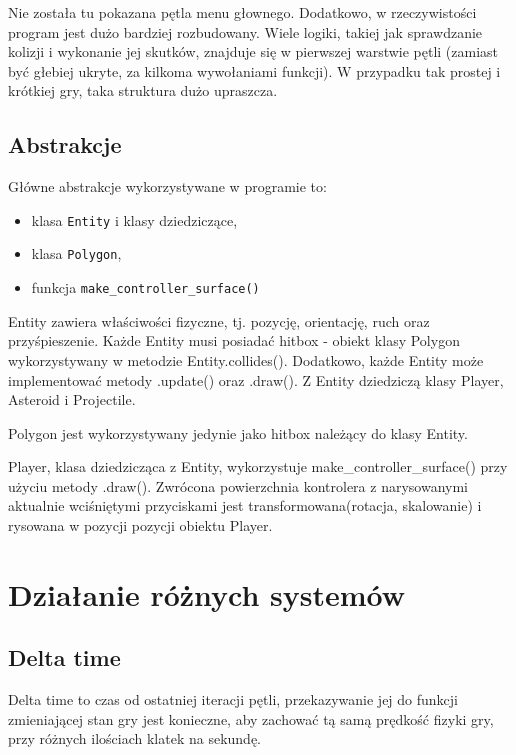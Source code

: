 \documentclass[12pt,a4paper]{article}
\begin{document}
\noindent Nie została tu pokazana pętla menu głownego. Dodatkowo, w rzeczywistości program jest dużo bardziej rozbudowany. 
Wiele logiki, takiej jak sprawdzanie kolizji i wykonanie jej skutków, znajduje się w pierwszej warstwie pętli (zamiast być głebiej ukryte, za kilkoma wywołaniami funkcji). W przypadku tak prostej i krótkiej gry, taka struktura dużo upraszcza.

\newpage
\subsection{Abstrakcje}
Główne abstrakcje wykorzystywane w programie to:
\begin{itemize}
\item klasa \texttt{Entity} i klasy dziedziczące,
\item klasa \texttt{Polygon},
\item funkcja \texttt{make\_controller\_surface()}
\end{itemize}

\vspace{\baselineskip}
\noindent Entity zawiera właściwości fizyczne, tj. pozycję, orientację, ruch oraz przyśpieszenie.
Każde Entity musi posiadać hitbox - obiekt klasy Polygon wykorzystywany w metodzie Entity.collides().
Dodatkowo, każde Entity może implementować metody .update() oraz .draw().
Z Entity dziedziczą klasy Player, Asteroid i Projectile.

\vspace{\baselineskip}
\noindent Polygon jest wykorzystywany jedynie jako hitbox należący do klasy Entity.

\vspace{\baselineskip}
\noindent Player, klasa dziedzicząca z Entity, wykorzystuje make\_controller\_surface() przy użyciu metody .draw().
Zwrócona powierzchnia kontrolera z narysowanymi aktualnie wciśniętymi przyciskami jest transformowana(rotacja, skalowanie) i rysowana w pozycji pozycji obiektu Player.


\section{Działanie różnych systemów}
\subsection{Delta time}
Delta time \cite{dt} to czas od ostatniej iteracji pętli, przekazywanie jej do funkcji zmieniającej stan gry jest konieczne, aby zachować tą samą prędkość fizyki gry, przy różnych ilościach klatek na sekundę.
\end{document}
